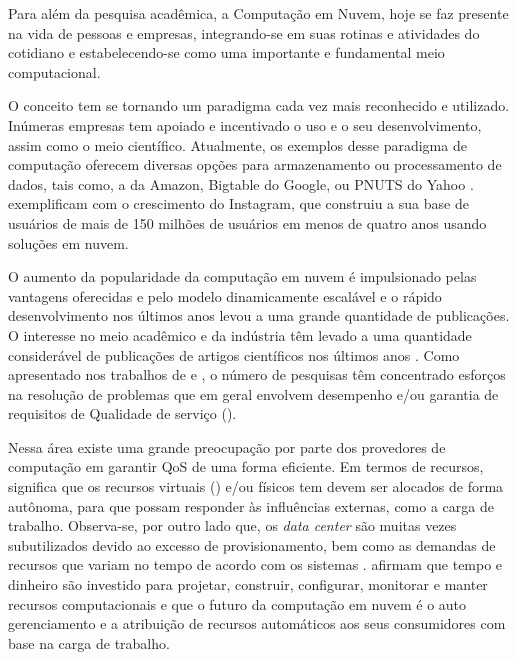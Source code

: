 \setcounter{page}{1}
Para além da pesquisa acadêmica, a Computação em Nuvem, hoje se faz presente na vida de pessoas e empresas, integrando-se em suas rotinas e atividades do cotidiano e estabelecendo-se como uma importante e fundamental meio computacional. 

O conceito tem se tornando um paradigma cada vez mais reconhecido e utilizado. Inúmeras empresas tem apoiado e incentivado o uso e o seu desenvolvimento, assim como o meio científico. Atualmente, os exemplos desse paradigma de computação oferecem diversas opções para armazenamento ou processamento de dados, tais como, a \textit{} da Amazon, Bigtable do Google, ou PNUTS do Yahoo \cite{Binnig2009}.  exemplificam com o crescimento do Instagram, que construiu a sua base de usuários de mais de 150 milhões de usuários em menos de quatro anos usando soluções em nuvem.

O aumento da popularidade da computação em nuvem é impulsionado pelas vantagens oferecidas e pelo modelo dinamicamente escalável e o rápido desenvolvimento nos últimos anos levou a uma grande quantidade de publicações. O interesse no meio acadêmico e da indústria têm levado a uma quantidade considerável de publicações de artigos científicos nos últimos anos \cite{Heilig2014}. Como apresentado nos trabalhos de  e , o número de pesquisas têm concentrado esforços na resolução de problemas que em geral envolvem desempenho e/ou garantia de requisitos de Qualidade de serviço (\textit{}). 

Nessa área existe uma grande preocupação por parte dos provedores de computação em garantir QoS de uma forma eficiente. Em termos de recursos, significa que os recursos virtuais (\textit{}) e/ou físicos tem devem ser alocados de forma autônoma, para que possam responder às influências externas, como a carga de trabalho. Observa-se, por outro lado que, os \textit{data center} são muitas vezes subutilizados devido ao excesso de provisionamento, bem como as demandas de recursos que variam no tempo de acordo com os sistemas \cite{Padala2007}.  afirmam que tempo e dinheiro são investido para projetar, construir, configurar, monitorar e manter recursos computacionais e que o futuro da computação em nuvem é o auto gerenciamento e a atribuição de recursos automáticos aos seus consumidores com base na carga de trabalho.

